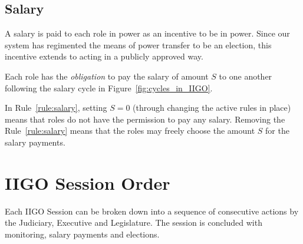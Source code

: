 

\subsection{Salary}
\label{subsec:salary}
A salary is paid to each role in power as an incentive to be in power. Since our system has regimented the means of power transfer to be an election, this incentive extends to acting in a publicly approved way. %
\begin{rule_IIGO} \label{rule:salary}
   Each role has the \emph{obligation} to pay the salary of amount $S$ to one another following the salary cycle in Figure~\ref{fig:cycles_in_IIGO}.
\end{rule_IIGO}

In Rule~\ref{rule:salary}, setting $S=0$ (through changing the active rules in place) means that roles do not have the permission to pay any salary. Removing the Rule~\ref{rule:salary} means that the roles may freely choose the amount $S$ for the salary payments.

\section{IIGO Session Order}
Each IIGO Session can be broken down into a sequence of consecutive actions by the Judiciary, Executive and Legislature. The session is concluded with monitoring, salary payments and elections.
